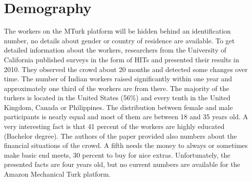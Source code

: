 \section{Demography}
The workers on the MTurk platform will be hidden behind an identification number, no details about gender or country of residence are available. To get detailed information about the workers, researchers from the University of California published surveys in the form of HITs\cite{ross} and presented their results in 2010. They observed the crowd about 20 months and detected some changes over time. The number of Indian workers raised significantly within one year and approximately one third of the workers are from there. The majority of the turkers is located in the United States (56\%) and every tenth in the United Kingdom, Canada or Philippines. The distribution between female and male participants is nearly equal and most of them are between 18 and 35 years old. A very interesting fact is that 41 percent of the workers are highly educated (Bachelor degree). The authors of the paper provided also numbers about the financial situations of the crowd.  A fifth needs the money to always or sometimes make basic end meets, 30 percent to buy for nice extras. 
Unfortunately, the presented facts are four years old, but no current numbers are available for the Amazon Mechanical Turk platform.


